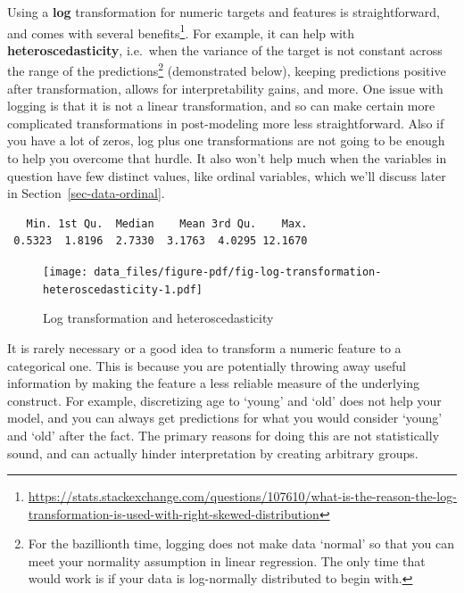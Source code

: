 \documentclass[
  letterpaper,
]{krantz}
\DeclareRobustCommand{\href}[2]{#2\footnote{\url{#1}}}
\begin{document}
Using a \textbf{log} transformation for numeric targets and features is
straightforward, and
\href{https://stats.stackexchange.com/questions/107610/what-is-the-reason-the-log-transformation-is-used-with-right-skewed-distribution}{comes
with several benefits}. For example, it can help with
\textbf{heteroscedasticity}, i.e.~when the variance of the target is not
constant across the range of the predictions\footnote{For the
  bazillionth time, logging does not make data `normal' so that you can
  meet your normality assumption in linear regression. The only time
  that would work is if your data is log-normally distributed to begin
  with.} (demonstrated below), keeping predictions positive after
transformation, allows for interpretability gains, and more. One issue
with logging is that it is not a linear transformation, and so can make
certain more complicated transformations in post-modeling more less
straightforward. Also if you have a lot of zeros, log plus one
transformations are not going to be enough to help you overcome that
hurdle. It also won't help much when the variables in question have few
distinct values, like ordinal variables, which we'll discuss later in
Section~\ref{sec-data-ordinal}.

\begin{verbatim}
   Min. 1st Qu.  Median    Mean 3rd Qu.    Max. 
 0.5323  1.8196  2.7330  3.1763  4.0295 12.1670 
\end{verbatim}

\begin{figure}

{\centering \texttt{[image: data\_files/figure-pdf/fig-log-transformation-heteroscedasticity-1.pdf]}

}

\caption{\label{fig-log-transformation-heteroscedasticity}Log
transformation and heteroscedasticity}

\end{figure}

\begin{tcolorbox}[enhanced jigsaw, toprule=.15mm, colback=white, breakable, rightrule=.15mm, arc=.35mm, bottomrule=.15mm, opacityback=0, colframe=quarto-callout-tip-color-frame, leftrule=.75mm, left=2mm]
\begin{minipage}[t]{5.5mm}
\textcolor{quarto-callout-tip-color}{\faLightbulb}
\end{minipage}%
\begin{minipage}[t]{\textwidth - 5.5mm}

It is rarely necessary or a good idea to transform a numeric feature to
a categorical one. This is because you are potentially throwing away
useful information by making the feature a less reliable measure of the
underlying construct. For example, discretizing age to `young' and `old'
does not help your model, and you can always get predictions for what
you would consider `young' and `old' after the fact. The primary reasons
for doing this are not statistically sound, and can actually hinder
interpretation by creating arbitrary groups.

\end{minipage}%
\end{tcolorbox}
\end{document}
